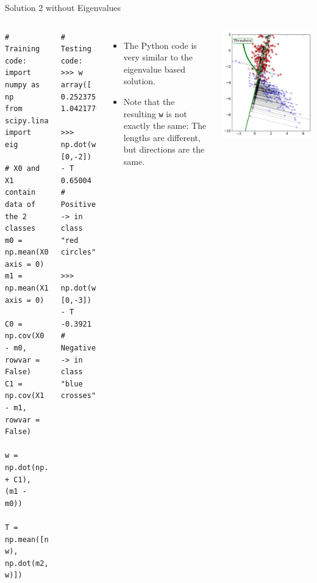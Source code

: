 \documentclass[10pt, aspectratio=169]{beamer} %
\begin{document}
\begin{frame}[fragile,allowframebreaks=0.8]
 {Solution 2 without Eigenvalues}
\begin{columns}[onlytextwidth]
\begin{lstlisting}
# Training code:
import numpy as np
from scipy.linalg import eig

# X0 and X1 contain data of the 2 classes
m0 = np.mean(X0.T, axis = 0)
m1 = np.mean(X1.T, axis = 0)

C0 = np.cov(X0 - m0, rowvar = False)
C1 = np.cov(X1 - m1, rowvar = False)

w = np.dot(np.linalg.inv(C0 + C1), (m1 - m0))

T = np.mean([np.dot(m1, w), np.dot(m2, w)])
\end{lstlisting}
\begin{lstlisting}
# Testing code:
>>> w
array([ 0.25237576,  1.04217702])

>>> np.dot(w, [0,-2]) - T
0.65004
# Positive -> in class "red circles"

>>> np.dot(w, [0,-3]) - T
-0.3921
# Negative -> in class "blue crosses"
\end{lstlisting}
\begin{itemize}
\item The Python code is very similar to the eigenvalue based solution.
\item Note that the resulting \verb+w+ is not exactly the same: The lengths
are different, but directions are the same.
\end{itemize}
\centerline{\includegraphics[width=0.6\columnwidth]{LDA_proj1_threshold.pdf}}
\end{columns}
\end{frame}
\end{document}

